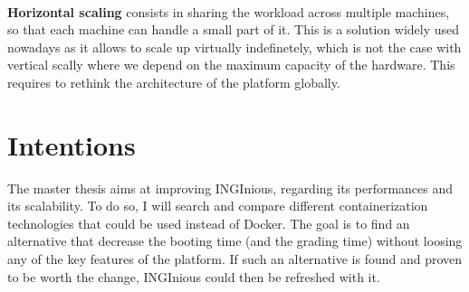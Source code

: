 \paragraph{} \textbf{Horizontal scaling} consists in sharing the workload across multiple machines, so that each machine can handle a small part of it.  This is a solution widely used nowadays as it allows to scale up virtually indefinetely, which is not the case with vertical scally where we depend on the maximum capacity of the hardware.  This requires to rethink the architecture of the platform globally.

\section{Intentions}
The master thesis aims at improving INGInious, regarding its performances and its scalability.  To do so, I will search and compare different containerization technologies that could be used instead of Docker.  The goal is to find an alternative that decrease the booting time (and the grading time) without loosing any of the key features of the platform.  If such an alternative is found and proven to be worth the change, INGInious could then be refreshed with it.
